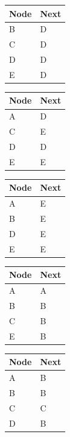 \documentclass{assignment}
\begin{document}
\begin{minipage}{0.4\textwidth}
  \centering
  
    \begin{tabular}[c]{l|l}
      \hline
      \multicolumn{1}{c|}{\textbf{Node}} & 
      \multicolumn{1}{c}{\textbf{Next}} \\
      \hline
      B & D\\
      C & D\\
      D & D\\
      E & D\\
      \hline
    \end{tabular}

    \begin{tabular}[c]{l|l}
      \hline
      \multicolumn{1}{c|}{\textbf{Node}} & 
      \multicolumn{1}{c}{\textbf{Next}} \\
      \hline
      A & D\\
      C & E\\
      D & D\\
      E & E\\
      \hline
    \end{tabular}

    \begin{tabular}[c]{l|l}
      \hline
      \multicolumn{1}{c|}{\textbf{Node}} & 
      \multicolumn{1}{c}{\textbf{Next}} \\
      \hline
      A & E\\
      B & E\\
      D & E\\
      E & E\\
      \hline
    \end{tabular}

\end{minipage}
\begin{minipage}{0.4\textwidth}
  \centering
    \begin{tabular}[c]{l|l}
      \hline
      \multicolumn{1}{c|}{\textbf{Node}} & 
      \multicolumn{1}{c}{\textbf{Next}} \\
      \hline
      A & A\\
      B & B\\
      C & B\\
      E & B\\
      \hline
    \end{tabular}

    \begin{tabular}[c]{l|l}
      \hline
      \multicolumn{1}{c|}{\textbf{Node}} & 
      \multicolumn{1}{c}{\textbf{Next}} \\
      \hline
      A & B\\
      B & B\\
      C & C\\
      D & B\\
      \hline
    \end{tabular}
\end{minipage}
\end{document}
